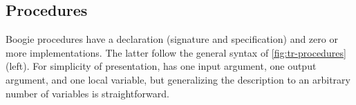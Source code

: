 \documentclass[a4paper,final]{llncs}
\makeatletter
\newif\iflong
\newcommand{\tr}{\mathcal{T}}
\newcommand{\Boogie}{Boogie\xspace}
\newcommand{\Why}{Why3\xspace}
\newcommand{\tightParagraph}[1]{\paragraph{#1}}
\newcommand\tightParagraph{\@startsection{paragraph}{4}{\z@}{-5\p@ \@plus -4\p@ \@minus -4\p@}{-0.5em \@plus -0.22em \@minus -0.1em}{\normalfont\normalsize\itshape}}
\newcommand{\feature}[1]{\subsection{#1}}
\makeatother
\begin{document}
\iflong
\tightParagraph{Bitvectors.}
\Why's theory \W{BitVectors} does not provide all operations that are supported by \Boogie.
In particular, it does not support \emph{extraction expressions} \B{b[n:m]} (drop the \B{m} least significant bits and return the next $\MB{n} - \MB{m}$ least significant bits) and \emph{concatenation expressions} \B{b +$\;$+ c} (the bit vector obtained by concatenating \B{b} and \B{c}).
$\tr$ introduces functions \W{extract (b: bv) (n: int) (m: int): bv} and \W{cat (b: bv) (c: bv): bv} 
and uses them to translate applications of these bit vector operators, but leaves them uninterpreted in \Why.
$\tr$'s implementation currently supports only the bitvectors operations available in \Why's theory \W{BitVectors}.
\fi





\feature{Procedures}

\Boogie procedures have a declaration (signature and specification) and zero or more implementations.
The latter follow the general syntax of \autoref{fig:tr-procedures} (left)\iflong, where a procedure \B{p} with input argument \B{t} and output argument \B{u} has one implementation with local variable \B{l} and body \B{B}\fi.
For simplicity of presentation,  has one input argument, one output argument, and one local variable, but generalizing the description to an arbitrary number of variables is straightforward.
\end{document}
